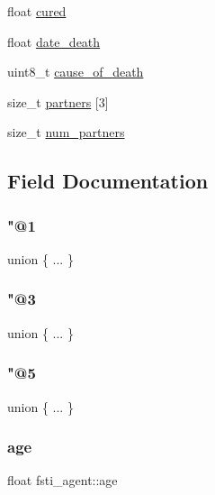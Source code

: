 \begin{DoxyCompactItemize}
\begin{tabbing}
\end{tabbing}\item 
float \mbox{\hyperlink{structfsti__agent_ad17ed58432c11de69fed459c6bdb4351}{cured}}
\item 
float \mbox{\hyperlink{structfsti__agent_a2f42afcd91c70a986d7a6c786e310260}{date\+\_\+death}}
\item 
uint8\+\_\+t \mbox{\hyperlink{structfsti__agent_a292854517270b640c6fdc35980e66637}{cause\+\_\+of\+\_\+death}}
\item 
size\+\_\+t \mbox{\hyperlink{structfsti__agent_a4ba0bd37a8c83bfdc08392a1cde56978}{partners}} \mbox{[}3\mbox{]}
\item 
size\+\_\+t \mbox{\hyperlink{structfsti__agent_aedbbb1bf31d18d91dd6b05f6d217755e}{num\+\_\+partners}}
\end{DoxyCompactItemize}


\subsection{Field Documentation}
\mbox{\label{structfsti__agent_ab3b3bd19ac6be32b26f9f34f9d45a787}} 
\subsubsection{\texorpdfstring{"@1}{@1}}
{\footnotesize\ttfamily union \{ ... \} }

\mbox{\label{structfsti__agent_a713e17295609286002f9a6d3d382aa38}} 
\subsubsection{\texorpdfstring{"@3}{@3}}
{\footnotesize\ttfamily union \{ ... \} }

\mbox{\label{structfsti__agent_a52bb574705012b7c4866aab627e81a53}} 
\subsubsection{\texorpdfstring{"@5}{@5}}
{\footnotesize\ttfamily union \{ ... \} }

\mbox{\label{structfsti__agent_a44c237039bb02720a770b625f905cf76}} 
\subsubsection{\texorpdfstring{age}{age}}
{\footnotesize\ttfamily float fsti\+\_\+agent\+::age}

